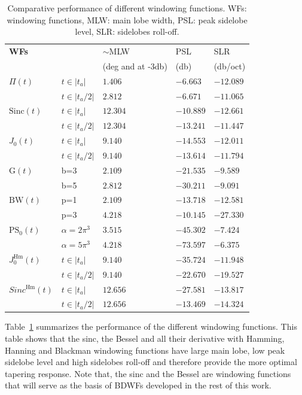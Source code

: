 \documentclass[useAMS,usenatbib]{mn2e}
\newcommand{\OMS}[1]{\textcolor{red}{{\bf OMS: #1}}}
\begin{document}
\begin{table}
\centering
\begin{tabular}{||l||ll|l|l||}
\hline
  \bf WFs&&{ $\sim$MLW} & { PSL}  & { SLR}   \\
  &&\hspace{-0.8cm}(deg and at -3db) & (db) & (db/oct)  \\
\hline\hline
{$\Pi(t)$}  & $t\in|t_a|$& $ 1.406$ &$-6.663$ &$-12.089$\\
	    & $t\in|t_a/2|$&$ 2.812$ &$-6.671$ &$-11.065$\\
\hline
{$\mathrm{Sinc}(t)$} & $t\in|t_a|$ &$ 12.304$& $-10.889$&  $-12.661$ \\
	 & $t\in|t_a/2|$ &$ 12.304$& $-13.241$&  $-11.447$ \\
\hline
{$J_0(t)$}& $t\in|t_a|$ &$ 9.140$ &$ -14.553$ & $ -12.011$\\
	  & $t\in|t_a/2|$ &$ 9.140$ &$ -13.614$ & $ -11.794$\\
\hline
{$\mathrm{G}(t)$} & b=3 &$ 2.109$& $-21.535$& $-9.589$\\ 
	 & b=5 &$ 2.812$& $-30.211$& $-9.091$\\ 
\hline
{$\mathrm{BW}(t)$} & p=1 &$ 2.109$ &$-13.718$ & $-12.581$\\
	  & p=3 &$ 4.218$ &$-10.145$ & $-27.330$\\
\hline
{$\mathrm{PS}_0(t)$} & $\alpha=2\pi^3$ &$ 3.515$& $-45.302$& $-7.424$\\ 
	 & $\alpha=5\pi^3$ &$ 4.218$& $-73.597$& $-6.375$\\ 
\hline
{$J_0^\mathrm{Hm}(t)$} & $t\in|t_a|$ &$ 9.140$&$-35.724$ & $-11.948$\\ 
 & $t\in|t_a/2|$ &$ 9.140$&$-22.670$&$-19.527$\\ 
\hline
{$Sinc^\mathrm{Hm}(t)$}  & $t\in|t_a|$ &$ 12.656 $&$-27.581$ &$-13.817$ \\ 
 &$t\in|t_a/2|$ &$12.656$&$-13.469$&$-14.324$\\
 \hline
\end{tabular}
\caption{\label{tab:WF:performance}Comparative performance of 
different windowing functions. WFs: windowing functions, MLW: main lobe width,  PSL: peak sidelobe level, SLR: sidelobes roll-off.}
\end{table}
Table~\ref{tab:WF:performance} summarizes the performance of the different windowing functions. 
This table shows that the sinc, the Bessel and all their derivative with Hamming, Hanning and Blackman windowing functions 
have large main lobe,  low peak sidelobe level and high sidelobes roll-off and therefore provide the more optimal tapering response.
Note that, the sinc and the Bessel are windowing functions that will serve as the basis of BDWFs developed in the rest of this work. 
\end{document}

